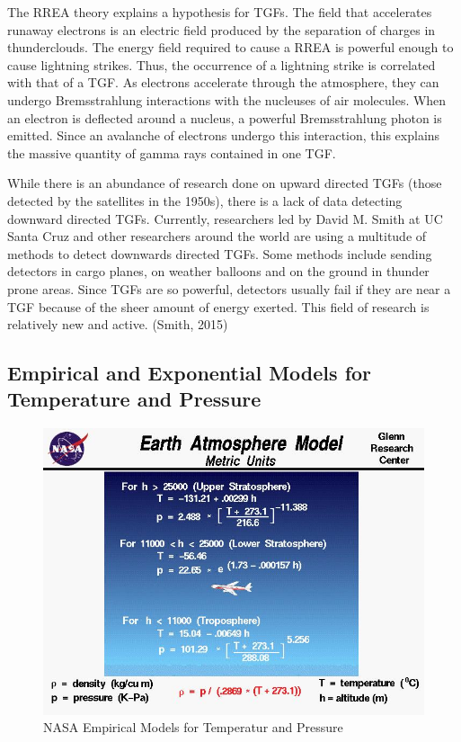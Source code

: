\documentclass[12pt,]{article}
\begin{document}
The RREA theory explains a hypothesis for TGFs. The field that
accelerates runaway electrons is an electric field produced by the
separation of charges in thunderclouds. The energy field required to
cause a RREA is powerful enough to cause lightning strikes. Thus, the
occurrence of a lightning strike is correlated with that of a TGF. As
electrons accelerate through the atmosphere, they can undergo
Bremsstrahlung interactions with the nucleuses of air molecules. When an
electron is deflected around a nucleus, a powerful Bremsstrahlung photon
is emitted. Since an avalanche of electrons undergo this interaction,
this explains the massive quantity of gamma rays contained in one TGF.

While there is an abundance of research done on upward directed TGFs
(those detected by the satellites in the 1950s), there is a lack of data
detecting downward directed TGFs. Currently, researchers led by David M.
Smith at UC Santa Cruz and other researchers around the world are using
a multitude of methods to detect downwards directed TGFs. Some methods
include sending detectors in cargo planes, on weather balloons and on
the ground in thunder prone areas. Since TGFs are so powerful, detectors
usually fail if they are near a TGF because of the sheer amount of
energy exerted. This field of research is relatively new and active.
(Smith, 2015)

\subsection{Empirical and Exponential Models for Temperature and
Pressure}\label{empirical-and-exponential-models-for-temperature-and-pressure}

\begin{figure}[h]

{\centering \includegraphics{assets/nasa_model} 

}

\caption{\label{fig:figs} NASA Empirical Models for Temperatur and Pressure}\label{fig:NASA_image}
\end{figure}
\end{document}
